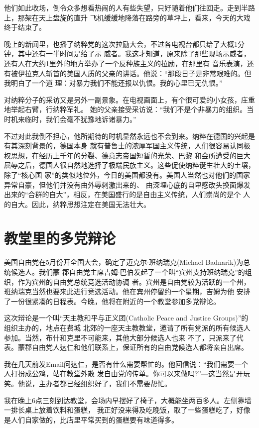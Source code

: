 ﻿\documentclass[11pt]{article}
\begin{document}
他们如此收场，倒令众多想看热闹的人有些失望，只好随着他们往回走。走到半路上，那架在天上盘旋的直升
飞机缓缓地降落在路旁的草坪上，看来，今天的大戏终于结束了。

晚上的新闻里，也播了纳粹党的这次拉励大会，不过各电视台都只给了大概1分钟，其中还有一半时间是给了示
威者。我这才知道，原来除了那些现场示威者，还有人在大约1里外的地方举办了一个反种族主义的拉励，在那里有
音乐表演，还有被伊拉克人斩首的美国人质的父亲的讲话。他说：``那段日子是非常艰难的。但我明白了一个道
理：对暴力我们不能还报以仇恨。我的心里已无仇恨。''

对纳粹分子的采访又是另外一副景象。在电视画面上，有个很可爱的小女孩，庄重地举起右臂，行纳粹军礼。
她的父亲接受采访说：``我们不是个非暴力的组织。当时机来临时，我们会毫不犹豫地诉诸暴力。''

不过对此我倒不担心，他所期待的时机显然永远也不会到来。纳粹在德国的兴起是有其深刻背景的，德国本身
就有普鲁士的浓厚军国主义传统，人们很容易认同极权思想，在经历上千年的分裂、德意志帝国短暂的光荣、巴黎
和会所遭受的巨大屈辱之后，德国人很自然地选择了极端民族主义。这些促使纳粹诞生壮大的土壤，除了``核心国
家''的类似地位外，今日的美国都没有。美国人当然也对他们的国家异常自豪，但他们并没有由外辱刺激出来的、
由深埋心底的自卑感改头换面爆发出来的``合群的自大''，相反，在美国盛行的是自由主义传统，人们崇尚的是个
人的自大。因此，纳粹思想注定在美国无法壮大。

\section{教堂里的多党辩论}

美国自由党在5月份开全国大会，确定了迈克尔$\cdot$班纳瑞克(Michael Badnarik)为总统候选人。我们蒙
郡自由党主席吉姆$\cdot$巴伯发起了一个叫``宾州支持班纳瑞克''的组织，作为宾州的自由党总统竞选活动协调
者。宾州是自由党较为活跃的一个州，班纳瑞克当然也要来此进行竞选活动。他在宾州停留约一个星期，吉姆为他
安排了一份很紧凑的日程表。今晚，他将在附近的一个教堂参加多党辩论。

这次辩论是一个叫``天主教和平与正义团(Catholic Peace and Justice Groups)''的组织主办的，地点在费城
北郊的一座天主教教堂，邀请了所有党派的所有候选人参加。当然，布什和克里不可能来，其他大部分候选人也来
不了，只派来了代表。蒙郡自由党人达仁和他们联系上，保证所有的自由党候选人都将亲自出席。

我在几天前发Email问达仁，是否有什么需要帮忙的。他回信说：``我们需要一个人打扮成公鸡，站在教堂外散
发自由党的传单。你可以来做吗?''---这当然是开玩笑。他说，主办者都已经组织好了，我们不需要帮忙。

我在晚上6点三刻到达教堂，会场内早摆好了椅子，大概能坐两百多人。左侧靠墙一排长桌上放着饮料和蛋糕，
我正好没来得及吃晚饭，取了一些蛋糕吃了，好像是人们自家做的，比店里平常买到的蛋糕要有味道得多。
\end{document}
